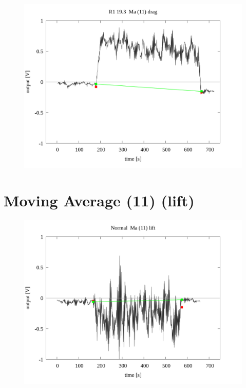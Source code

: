 \documentclass[a4paper]{jsarticle}
\begin{document}
\begin{figure}[htbp]
    \footnotesize
    \begin{center}
        \includegraphics[width=140mm]{../../../../33_result/210806/moving_average/11/drag/03/R1_19.3_ma(11)_drag_03.png}
    \end{center}
\end{figure}

\section{Moving Average (11) (lift)}

\begin{figure}[htbp]
    \footnotesize
    \begin{center}
        \includegraphics[width=140mm]{../../../../33_result/210806/moving_average/11/lift/03/Normal_ma(11)_lift_03.png}
    \end{center}
\end{figure}
\end{document}
